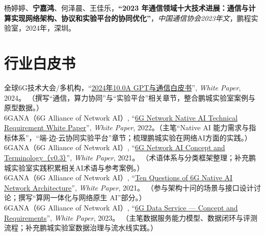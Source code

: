 \documentclass{resume}
\begin{document}

杨婷婷、\textbf{宁嘉鸿}、何泽晨、王佳乐，\textbf{“2023 年通信领域十大技术进展：通信与计算实现网络架构、协议和实验平台的协同优化”}，\emph{中国通信协会2023年文}，鹏程实验室，2024年，深圳。
\vspace{3mm}
\section{行业白皮书}

全球6G技术大会/多机构，``\href{https://www.sgpjbg.com/baogao/159946.html}{2024年10.0A GPT与通信白皮书}'', \emph{White Paper}, 2024。 （撰写“通信，算力协同”与“实验平台”相关章节，整合鹏城实验室案例与原型数据。）\\

6GANA（6G Alliance of Network AI）, ``\href{https://www.6g-ana.com/upload/file/20230313/6381433864422340009478203.pdf}{6G Network Native AI Technical Requirement White Paper}'', \emph{White Paper}, 2022。（主笔“Native AI 能力需求与指标体系”，“端-边-云协同实验平台”章节；梳理鹏城实验在网络AI方面的实践。）\\

6GANA（6G Alliance of Network AI）, ``\href{https://www.6g-ana.com/upload/file/20230313/6381433864369996165807627.pdf}{6G Network AI Concept and Terminology（v0.3）}'', \emph{White Paper}, 2021。 （术语体系与分类框架整理；补充鹏城实验室实践积累相关AI术语与参考案例。）\\

6GANA（6G Alliance of Network AI）, ``\href{https://www.6g-ana.com/upload/file/20230313/6381433864517755268320123.pdf}{Ten Questions of 6G Native AI Network Architecture}'', \emph{White Paper}, 2021。 （参与架构十问的场景与接口设计讨论；撰写“算网一体化与网络原生 AI”部分。）\\

6GANA（6G Alliance of Network AI）, ``\href{https://www.6g-ana.com/upload/file/20230313/6381433867377232541385028.pdf}{6G Data Service — Concept and Requirements}'', \emph{White Paper}, 2023。 （主笔数据服务能力模型、数据闭环与评测流程；补充鹏城实验室数据治理与流水线实践。）\\
\end{document}
